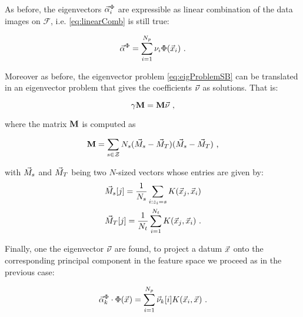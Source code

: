 As before, the eigenvectors $\AAlpha^\Phi_i$ are expressible as linear combination of the data images on $\mathcal{F}$, i.e. \eqref{eq:linearComb} is still true:

\begin{equation}
\AAlpha^\Phi = \sum_{i=1}^{\nbProfilingTraces}\nu_i \Phi(\vLeakVec_{i}) \mbox{ .}
\end{equation}

Moreover as before, the eigenvector problem \eqref{eq:eigProblemSB} can be translated in an eigenvector problem that gives the coefficients $\nununu$ as solutions. That is:

\begin{equation}\label{eq:eigProblemM}
\gamma\MMM = \MMM \nununu \mbox{ ,}
\end{equation}

where the matrix $\MMM$ is computed as

\begin{equation}
\MMM = \sum_{\sensVarGenValue\in\sensVarSet}\nbTracesPerClass(\MMMclass - \MMMT)(\MMMclass-\MMMT)\mbox{ ,}
\end{equation}

with $\MMMclass$ and $\MMMT$ being two $N$-sized vectors whose entries are given by:
\begin{align}
\MMMclass[\sensVarGenValue][j] = \frac{1}{\nbTracesPerClass}\sum_{i:\sensVar_i=\sensVarGenValue}K(\vLeakVec_j,\vLeakVec_i)\\
\MMMT[j] = \frac{1}{\nbTrainingTraces}\sum_{i=1}^{\nbTrainingTraces}K(\vLeakVec_{j},\vLeakVec_{i}) \mbox{ .}
\end{align}

Finally, one the eigenvector $\nununu$ are found, to project a datum $\vLeakVec_{}$ onto the corresponding principal component in the feature space we proceed as in the previous case:

\begin{equation} \label{eq:projection}
\AAlpha^\Phi_k \cdot \Phi(\vLeakVec_{}) =  \sum_{i=1}^{\nbProfilingTraces}\nununu_k[i]K(\vLeakVec_{i}, \vLeakVec_{}) \mbox{ .}
\end{equation}
